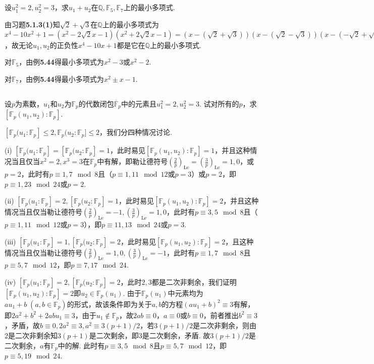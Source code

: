 \subsection{}
设$u_1^2=2, u_2^2=3$，求$u_1+u_2$在$\mathbb{Q}, \mathbb{F}_5, \mathbb{F}_7$上的最小多项式.

\jie 由{\heiti 习题}\textbf{5.1.3(1)}知$\sqrt{2}+\sqrt{3}$在$\mathbb{Q}$上的最小多项式为$x^4-10x^2+1=(x^2-2\sqrt{2}x-1)(x^2+2\sqrt{2}x-1)=(x-(\sqrt{2}+\sqrt{3}))(x-(\sqrt{2}-\sqrt{3}))(x-(-\sqrt{2}+\sqrt{3}))(x-(-\sqrt{2}-\sqrt{3}))$，故无论$u_1,u_2$的正负性$x^4-10x+1$都是它在$\mathbb{Q}$上的最小多项式.

对$\mathbb{F}_5$，由{\heiti 例}\textbf{5.44}得最小多项式为$x^2-3$或$x^2-2$.

对$\mathbb{F}_7$，由{\heiti 例}\textbf{5.44}得最小多项式为$x^2\pm x-1$.

\subsection{}
设$p$为素数，$u_1$和$u_2$为$\mathbb{F}_p$的代数闭包$\overline{\mathbb{F}}_p$中的元素且$u_1^2=2, u_2^2=3$. 试对所有的$p$，求$[\mathbb{F}_p(u_1,u_2):\mathbb{F}_p]$.

\jie $[\mathbb{F}_p(u_1:\mathbb{F}_p]\leq 2, \mathbb{F}_p(u_2:\mathbb{F}_p]\leq 2$，我们分四种情况讨论.

(i) $[\mathbb{F}_p(u_1:\mathbb{F}_p]=[\mathbb{F}_p(u_2:\mathbb{F}_p]=1$，此时易见$[\mathbb{F}_p(u_1,u_2):\mathbb{F}_p]=1$，并且这种情况当且仅当$x^2=2,x^3=3$在$\mathbb{F}_p$中有解，即勒让德符号$\left(\frac{2}{p}\right)_{\mathrm{Le}}=\left(\frac{3}{p}\right)_{\mathrm{Le}}=1,0$，或$p=2$，此时有$p\equiv 1,7\mod 8$且（$p\equiv 1,11\mod 12$或$p=3$）或$p=2$，即$p\equiv 1,23\mod 24$或$p=2$.

(ii) $[\mathbb{F}_p(u_1:\mathbb{F}_p]=2,[\mathbb{F}_p(u_2:\mathbb{F}_p]=1$，此时易见$[\mathbb{F}_p(u_1,u_2):\mathbb{F}_p]=2$，并且这种情况当且仅当勒让德符号$\left(\frac{2}{p}\right)_{\mathrm{Le}}=-1,\left(\frac{3}{p}\right)_{\mathrm{Le}}=1,0$，此时有$p\equiv 3,5\mod 8$且（$p\equiv 1,11\mod 12$或$p=3$），即$p\equiv 11,13\mod 24$或$p=3$.

(iii) $[\mathbb{F}_p(u_1:\mathbb{F}_p]=1,[\mathbb{F}_p(u_2:\mathbb{F}_p]=2$，此时易见$[\mathbb{F}_p(u_1,u_2):\mathbb{F}_p]=2$，且这种情况当且仅当勒让德符号$\left(\frac{2}{p}\right)_{\mathrm{Le}}=1,0,\left(\frac{3}{p}\right)_{\mathrm{Le}}=-1$，此时有$p\equiv 1,7\mod 8$且$p\equiv 5,7\mod 12$，即$p\equiv 7,17\mod 24$.

(iv) $[\mathbb{F}_p(u_1:\mathbb{F}_p]=2,[\mathbb{F}_p(u_2:\mathbb{F}_p]=2$，此时$2,3$都是二次非剩余，我们证明$[\mathbb{F}_p(u_1,u_2):\mathbb{F}_p]=2$即$u_2\in\mathbb{F}_p(u_1)$. 由于$\mathbb{F}_p(u_1)$中元素均为$au_1+b\;(a,b\in\mathbb{F}_p)$的形式，故该条件即为关于$a,b$的方程$(au_1+b)^2\equiv3$有解，即$2a^2+b^2+2abu_1\equiv3$，由于$u_1\notin\mathbb{F}_p$，故$2ab\equiv0$，$a\equiv0$或$b\equiv0$，前者推出$b^2\equiv3$，矛盾，故$b\equiv0, 2a^2\equiv3, a^2\equiv3(p+1)/2$，若$3(p+1)/2$是二次非剩余，则由$2$是二次非剩余知$3(p+1)$是二次剩余，即$3$是二次剩余，矛盾. 故$3(p+1)/2$是二次剩余，$a$有$\mathbb{F}_p$中的解. 此时有$p\equiv 3,5\mod 8$且$p\equiv 5,7\mod 12$，即$p\equiv 5,19\mod 24$.

